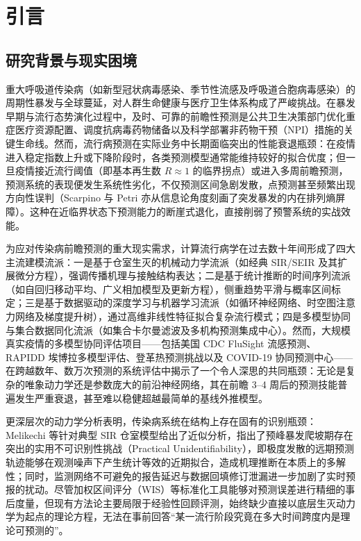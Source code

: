 \documentclass[11pt,a4paper]{article}
\theoremstyle{plain}
\theoremstyle{definition}
\begin{document}
\vspace{1.5em}

\section{引言}

\subsection{研究背景与现实困境}

重大呼吸道传染病（如新型冠状病毒感染、季节性流感及呼吸道合胞病毒感染）的周期性暴发与全球蔓延，对人群生命健康与医疗卫生体系构成了严峻挑战。在暴发早期与流行态势演化过程中，及时、可靠的前瞻性预测是公共卫生决策部门优化重症医疗资源配置、调度抗病毒药物储备以及科学部署非药物干预（NPI）措施的关键生命线。然而，流行病预测在实际业务中长期面临突出的性能衰退瓶颈：在疫情进入稳定指数上升或下降阶段时，各类预测模型通常能维持较好的拟合优度；但一旦疫情接近流行阈值（即基本再生数 $R \approx 1$ 的临界拐点）或进入多周前瞻预测，预测系统的表现便发生系统性劣化，不仅预测区间急剧发散，点预测甚至频繁出现方向性误判\citep{scarpino2019predictability, reich2019collaborative}（Scarpino 与 Petri\citep{scarpino2019predictability} 亦从信息论角度刻画了突发暴发的内在排列熵屏障）。这种在近临界状态下预测能力的断崖式退化，直接削弱了预警系统的实战效能。

为应对传染病前瞻预测的重大现实需求，计算流行病学在过去数十年间形成了四大主流建模流派：一是基于仓室生灭的机械动力学流派（如经典 SIR/SEIR 及其扩展微分方程），强调传播机理与接触结构表达；二是基于统计推断的时间序列流派（如自回归移动平均、广义相加模型及更新方程），侧重趋势平滑与概率区间标定；三是基于数据驱动的深度学习与机器学习流派（如循环神经网络、时空图注意力网络及梯度提升树），通过高维非线性特征拟合复杂流行模式；四是多模型协同与集合数据同化流派（如集合卡尔曼滤波及多机构预测集成中心）。然而，大规模真实疫情的多模型协同评估项目——包括美国 CDC FluSight 流感预测\citep{mcgowan2019collaborative, flusight2024evaluation}、RAPIDD 埃博拉多模型评估\citep{viboud2018rapidd}、登革热预测挑战\citep{johansson2019open}以及 COVID-19 协同预测中心\citep{cramer2022evaluation}——在跨越数年、数万次预测的系统评估中揭示了一个令人深思的共同瓶颈：无论是复杂的唯象动力学还是参数庞大的前沿神经网络，其在前瞻 3--4 周后的预测技能普遍发生严重衰退，甚至难以稳健超越最简单的基线外推模型\citep{suez2026baseline, lopez2024challenges}。

更深层次的动力学分析表明，传染病系统在结构上存在固有的识别瓶颈：Melikechi 等\citep{melikechi2022limits}针对典型 SIR 仓室模型给出了近似分析，指出了预峰暴发爬坡期存在突出的实用不可识别性挑战（Practical Unidentifiability），即极度发散的远期预测轨迹能够在观测噪声下产生统计等效的近期拟合，造成机理推断在本质上的多解性；同时，监测网络不可避免的报告延迟与数据回填修订泄漏进一步加剧了实时预报的扰动\citep{mcdonald2021auxiliary}。尽管加权区间评分（WIS）\citep{bracher2021evaluating}等标准化工具能够对预测误差进行精细的事后度量，但现有方法论主要局限于经验性回顾评测，始终缺少直接以底层生灭动力学为起点的理论方程，无法在事前回答“某一流行阶段究竟在多大时间跨度内是理论可预测的”。
\end{document}

